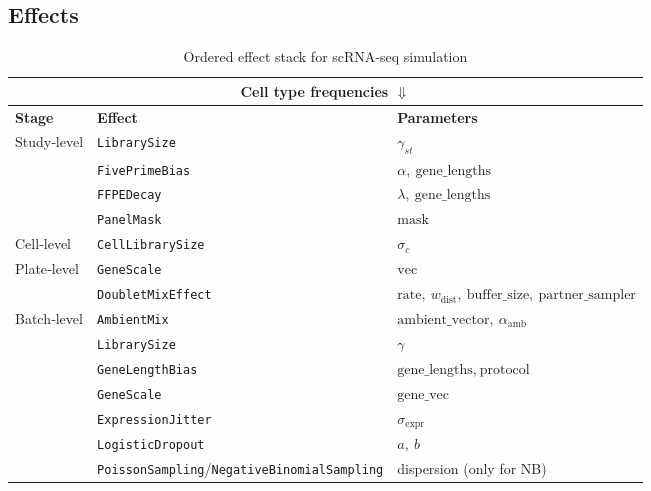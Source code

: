 \documentclass{article}
\begin{document}
\subsection{Effects}

\begin{table}[!ht]
	\centering
	\begin{tabular}{lll}
		\toprule
		\multicolumn{3}{c}{Cell type frequencies $\Downarrow$} \\
		\midrule
		\textbf{Stage} & \textbf{Effect} & \textbf{Parameters} \\
		\midrule
		\multirow{4}{*}{Study‐level} 
		& \texttt{LibrarySize}         & $\gamma_{st}$ \\
		& \texttt{FivePrimeBias}       & $\alpha,\ \text{gene\_lengths}$ \\
		& \texttt{FFPEDecay}           & $\lambda,\ \text{gene\_lengths}$ \\
		& \texttt{PanelMask}           & $\text{mask}$ \\
		\midrule
		Cell‐level       & \texttt{CellLibrarySize}     & $\sigma_{c}$ \\
		\midrule
		\multirow{2}{*}{Plate‐level} 
		& \texttt{GeneScale}           & $\text{vec}$ \\
		& \texttt{DoubletMixEffect}    & $\text{rate},\ w_{\text{dist}},\ \text{buffer\_size},\ \text{partner\_sampler}$ \\
		\midrule
		\multirow{7}{*}{Batch‐level} 
		& \texttt{AmbientMix}          & $\text{ambient\_vector},\ \alpha_{\text{amb}}$ \\
		& \texttt{LibrarySize}         & $\gamma$ \\
		& \texttt{GeneLengthBias}      & $\text{gene\_lengths},\ \text{protocol}$ \\
		& \texttt{GeneScale}           & $\text{gene\_vec}$ \\
		& \texttt{ExpressionJitter}    & $\sigma_{\text{expr}}$ \\
		& \texttt{LogisticDropout}     & $a,\ b$ \\
		& \texttt{PoissonSampling}/\texttt{NegativeBinomialSampling}
		& {dispersion (only for NB)} \\
		\bottomrule
	\end{tabular}
	\caption{Ordered effect stack for scRNA‐seq simulation}
	\label{tab:effect_stack}
\end{table}
\end{document}
